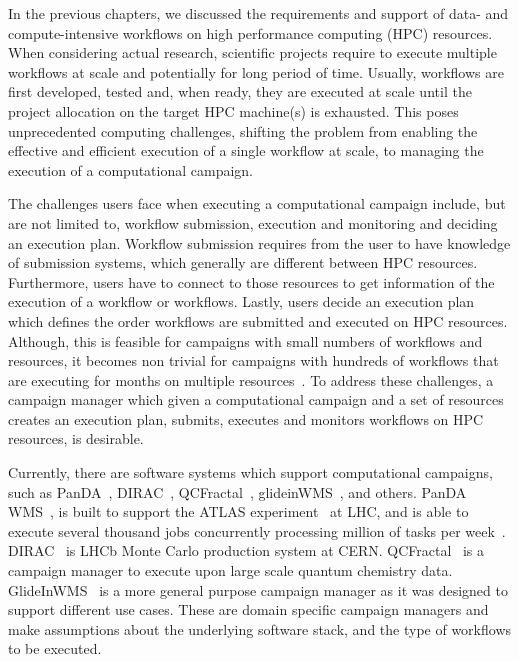 \label{ch:cmanager}

In the previous chapters, we discussed the requirements and support of data- and compute-intensive workflows on high performance computing (HPC) resources. 
When considering actual research, scientific projects require to execute multiple workflows at scale and potentially for long period of time.
Usually, workflows are first developed, tested and, when ready, they are executed at scale until the project allocation on the target HPC machine(s) is exhausted. 
This poses unprecedented computing challenges, shifting the problem from enabling the effective and efficient execution of a single workflow at scale, to managing the execution of a computational campaign.

The challenges users face when executing a computational campaign include, but are not limited to, workflow submission, execution and monitoring and deciding an execution plan.
Workflow submission requires from the user to have knowledge of submission systems, which generally are different between HPC resources.
Furthermore, users have to connect to those resources to get information of the execution of a workflow or workflows.
Lastly, users decide an execution plan which defines the order workflows are submitted and executed on HPC resources.
Although, this is feasible for campaigns with small numbers of workflows and resources, it becomes non trivial for campaigns with hundreds of workflows that are executing for months on multiple resources~\cite{smith2020molssi}.
To address these challenges, a campaign manager which given a computational campaign and a set of resources creates an execution plan, submits, executes and monitors workflows on HPC resources, is desirable.

Currently, there are software systems which support computational campaigns, such as PanDA~\cite{maeno2008panda}, DIRAC~\cite{casajus2010dirac}, QCFractal~\cite{qcfractal}, glideinWMS~\cite{sfiligoi2008glidein}, and others.
PanDA WMS~\cite{maeno2008panda}, is built to support the ATLAS experiment~\cite{atlas} at LHC, and is able to execute several thousand jobs concurrently processing million of tasks per week~\cite{de2015future}.
DIRAC~\cite{tsaregorodtsev2003dirac} is LHCb Monte Carlo production system at CERN.
QCFractal~\cite{qcfractal} is a campaign manager to execute upon large scale quantum chemistry data.
GlideInWMS~\cite{sfiligoi2008glidein} is a more general purpose campaign manager as it was designed to support different use cases.
These are domain specific campaign managers and make assumptions about the underlying software stack, and the type of workflows to be executed.

